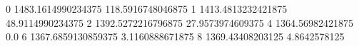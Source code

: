 0 1483.1614990234375 118.5916748046875
1 1413.4813232421875 48.9114990234375
2 1392.5272216796875 27.9573974609375
4 1364.56982421875 0.0
6 1367.6859130859375 3.1160888671875
8 1369.43408203125 4.8642578125
